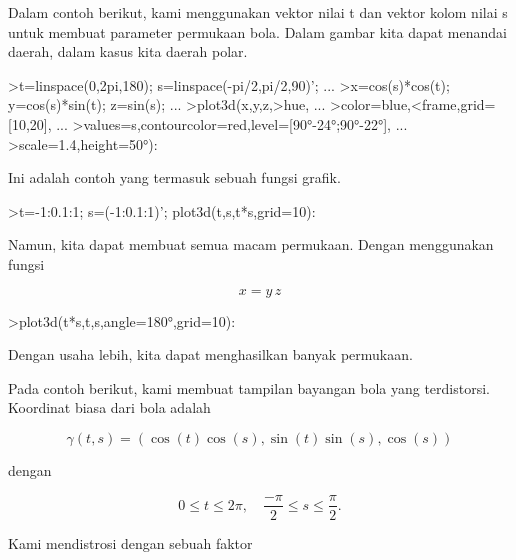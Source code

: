 \documentclass[a4paper,10pt]{article}
\begin{document}
\begin{eulernotebook}
\begin{eulercomment}
\begin{eulercomment}
\begin{eulercomment}
Dalam contoh berikut, kami menggunakan vektor nilai t dan vektor kolom
nilai s untuk membuat parameter permukaan bola. Dalam gambar kita
dapat menandai daerah, dalam kasus kita daerah polar.
\end{eulercomment}
\begin{eulerprompt}
>t=linspace(0,2pi,180); s=linspace(-pi/2,pi/2,90)'; ...
>x=cos(s)*cos(t); y=cos(s)*sin(t); z=sin(s); ...
>plot3d(x,y,z,>hue, ...
>color=blue,<frame,grid=[10,20], ...
>values=s,contourcolor=red,level=[90°-24°;90°-22°], ...
>scale=1.4,height=50°):
\end{eulerprompt}
\begin{eulercomment}
Ini adalah contoh yang termasuk sebuah fungsi grafik.
\end{eulercomment}
\begin{eulerprompt}
>t=-1:0.1:1; s=(-1:0.1:1)'; plot3d(t,s,t*s,grid=10):
\end{eulerprompt}
\begin{eulercomment}
Namun, kita dapat membuat semua macam permukaan. Dengan menggunakan
fungsi

\end{eulercomment}
\begin{eulerformula}
\[
x = y \, z
\]
\end{eulerformula}
\begin{eulerprompt}
>plot3d(t*s,t,s,angle=180°,grid=10):
\end{eulerprompt}
\begin{eulercomment}
Dengan usaha lebih, kita dapat menghasilkan banyak permukaan.

Pada contoh berikut, kami membuat tampilan bayangan bola yang
terdistorsi. Koordinat biasa dari bola adalah

\end{eulercomment}
\begin{eulerformula}
\[
\gamma(t,s) = (\cos(t)\cos(s),\sin(t)\sin(s),\cos(s))
\]
\end{eulerformula}
\begin{eulercomment}
dengan

\end{eulercomment}
\begin{eulerformula}
\[
0 \le t \le 2\pi, \quad \frac{-\pi}{2} \le s \le \frac{\pi}{2}.
\]
\end{eulerformula}
\begin{eulercomment}
Kami mendistrosi dengan sebuah faktor


\end{eulercomment}
\end{eulercomment}
\end{eulercomment}
\end{eulernotebook}
\end{document}
